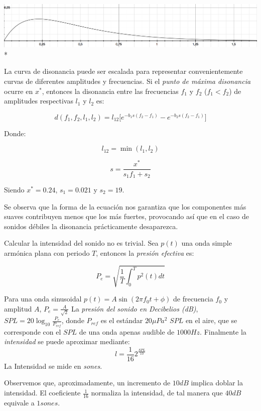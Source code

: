 \documentclass[11pt,a4paper]{article}
\begin{document}
    \includegraphics[scale=0.4]{CDisonancia2} \\*
    
    La curva de disonancia puede ser escalada para representar convenientemente curvas de diferentes amplitudes y frecuencias. Si el \textit{punto de máxima disonancia} ocurre en $x^{*}$, entonces la disonancia entre las frecuencias $f_1$ y $f_2$ ($f_1 < f_2$) de amplitudes respectivas $l_1$ y $l_2$ es:
    
    $$
        \boxed{
            d(f_1, f_2, l_1, l_2) = l_{12} [e^{-b_1 s (f_2 - f_1)} -  e^{-b_2 s (f_2 - f_1)}
        }
    ]$$
 
    Donde:
    
    $$
        l_{12} =\min(l_1, l_2)
    $$
    
    $$ 
        s = \frac{x^{*}}{s_1 f_1 + s_2}
    $$
    
    Siendo $x^{*} = 0.24$, $s_1 = 0.021$ y $s_2 = 19$.

    Se observa que la forma de la ecuación nos garantiza que los componentes más suaves contribuyen menos que los más fuertes, provocando así que en el caso de sonidos débiles la disonancia prácticamente desaparezca.

    Calcular la intensidad del sonido no es trivial. Sea $p(t)$ una onda simple armónica plana con periodo $T$, entonces la \emph{presión efectiva} es:
    
    $$
        P_e = \sqrt{\frac{1}{T} \int_{0}^{T}{p^{2}(t) dt}} 
    $$

    Para una onda sinusoidal $ p(t) = A \sin{(2 \pi f_0 t + \phi)} $ de frecuencia $f_0$ y amplitud $A$, 
    $P_e = \frac{A} {\sqrt{2}}$ La \emph{presión del sonido en Decibelios (dB)},
    $ SPL = 20 \log_{10}{\frac{P_e}{P_{ref}}}$, donde $P_{ref}$ es el estándar $20 \mu Pa^{2}$ $SPL$ en el aire, que se corresponde con el $SPL$ de una onda apenas audible de $1000 Hz$. Finalmente la \emph{intensidad} se puede aproximar mediante:
    $$ l = \frac{1}{16} 2^{\frac{SPL}{10}} $$
    La Intensidad se mide en \emph{sones}.

    Observemos que, aproximadamente, un incremento de $10 dB$ implica doblar la intensidad. El coeficiente $\frac{1}{16}$ normaliza la intensidad, de tal manera que $40 dB$ equivale a $1 sones$.
      
\end{document}
